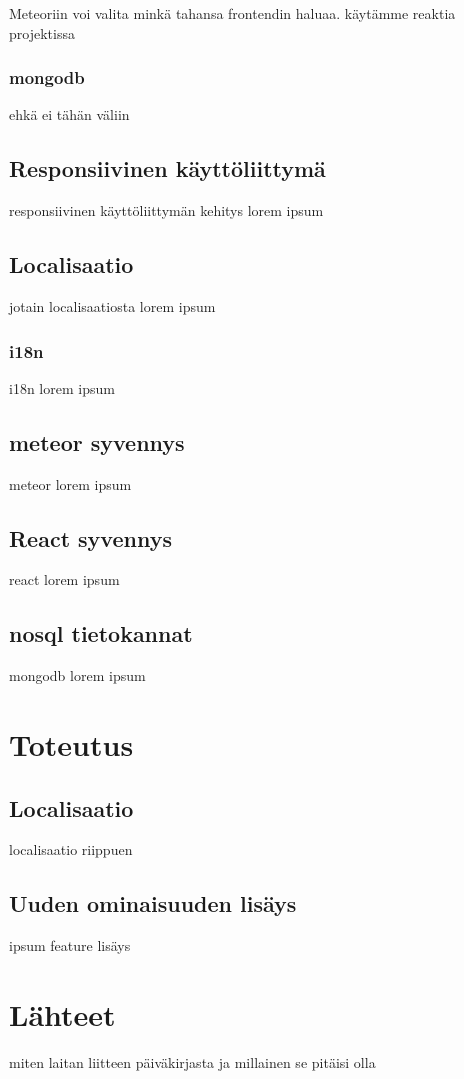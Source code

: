 \documentclass[11pt,a4paper,titlepage,oneside]{article}
\begin{document}
Meteoriin voi valita minkä tahansa frontendin haluaa. käytämme reaktia projektissa

\subsubsection{mongodb}
ehkä ei tähän väliin






\subsection{Responsiivinen käyttöliittymä}
responsiivinen käyttöliittymän kehitys lorem ipsum






\subsection{Localisaatio}
jotain localisaatiosta lorem ipsum

\subsubsection{i18n}
i18n lorem ipsum



\subsection{meteor syvennys} 
meteor lorem ipsum


\subsection{React syvennys}
react lorem ipsum 



\subsection{nosql tietokannat}

mongodb lorem ipsum








\newpage
\section{Toteutus}              %


\subsection{Localisaatio}
localisaatio riippuen 


\subsection{Uuden ominaisuuden lisäys}
ipsum feature lisäys



\newpage
\section{Lähteet}               %

miten laitan liitteen päiväkirjasta ja millainen se pitäisi olla
\end{document}
